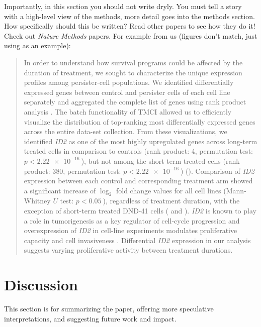 \begin{refsegment}
Importantly, in this section you should not write dryly. You must tell a story
with a high-level view of the methods, more detail goes into the methods
section. How specifically should this be written? Read other papers to see how
they do it! Check out \textit{Nature Methods} papers. For example from us
(figures don't match, just using as an example):

\begin{quote}
In order to understand how survival programs could be affected by the duration
of treatment, we sought to characterize the unique expression profiles among
persister-cell populations. We identified differentially expressed genes between
control and persister cells of each cell line separately and aggregated the
complete list of genes using rank product analysis
\autocite{breitlingFEBSLetters2004}. The batch functionality of TMCI allowed us
to efficiently visualize the distribution of top-ranking most differentially
expressed genes across the entire data-set collection. From these
visualizations, we identified \textit{ID2} as one of the most highly upregulated
genes across long-term treated cells in comparison to controls (rank product: 4,
permutation test: \(p < \SI{2.22e-16}{}\)), but not among the short-term treated
cells (rank product: 380, permutation test: \(p < \SI{2.22e-16}{}\))
(). Comparison of
  \textit{ID2} expression between each control and corresponding treatment arm
  showed a significant increase of \(\log_2\) fold change values for all cell
  lines (Mann-Whitney \(U\) test: \(p < \SI{0.05}{}\)), regardless of treatment
  duration, with the exception of short-term treated DND-41 cells
  ( and ). \textit{ID2} is known to play
  a role in tumorigenesis as a key regulator of cell-cycle progression and
  overexpression of \textit{ID2} in cell-line experiments modulates
  proliferative capacity and cell invasiveness \autocite{itahana_role_2003,
    stighall_high_2005}. Differential \textit{ID2} expression in our analysis
  suggests varying proliferative activity between treatment durations.
\end{quote}

\section*{Discussion}

This section is for summarizing the paper, offering more speculative
interpretations, and suggesting future work and impact.


\end{refsegment}
